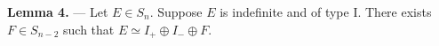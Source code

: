 \textbf{Lemma 4.} — Let $E \in S_n$. Suppose $E$ is indefinite and of type I. There exists $F \in S_{n-2}$ such that $E \simeq I_+ \oplus I_- \oplus F$.
